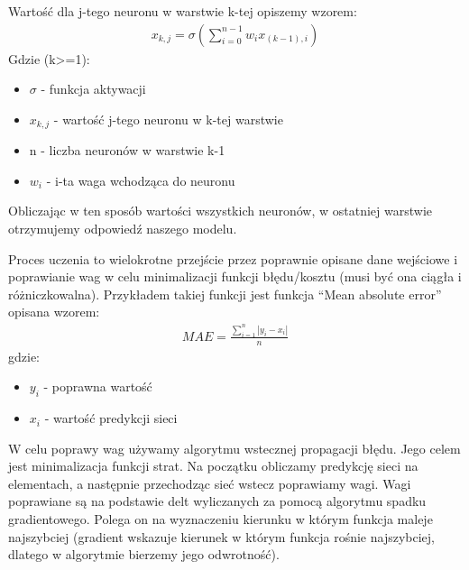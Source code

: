 \documentclass{article}
\begin{document}
Wartość dla j-tego neuronu w warstwie k-tej opiszemy wzorem:
\begin{align*}
    x_{k,j} = \sigma(\sum\limits_{i=0}^{n-1}{w_ix_{(k-1),i}})
\end{align*}
Gdzie (k>=1):
\begin{itemize}
    \item $\sigma$ - funkcja aktywacji
    \item $x_{k,j}$ - wartość j-tego neuronu w k-tej warstwie
    \item n - liczba neuronów w warstwie k-1
    \item $w_i$ - i-ta waga wchodząca do neuronu
\end{itemize}
Obliczając w ten sposób wartości wszystkich neuronów, w ostatniej warstwie otrzymujemy odpowiedź naszego modelu.

Proces uczenia to wielokrotne przejście przez poprawnie opisane dane wejściowe i poprawianie wag w celu minimalizacji funkcji błędu/kosztu (musi być ona ciągła i różniczkowalna).
Przykładem takiej funkcji jest funkcja ``Mean absolute error''\cite{mae-tf} opisana wzorem\cite{mae}:
\begin{align*}
    MAE=\frac{\sum\limits_{i=1}^{n}|{y_i - x_i}|}{n}
\end{align*}
gdzie:
\begin{itemize}
    \item $y_i$ - poprawna wartość
    \item $x_i$ - wartość predykcji sieci
\end{itemize}
W celu poprawy wag używamy algorytmu wstecznej propagacji błędu. Jego celem jest minimalizacja funkcji strat.
Na początku obliczamy predykcję sieci na elementach, a następnie przechodząc sieć wstecz poprawiamy wagi.
Wagi poprawiane są na podstawie delt wyliczanych za pomocą algorytmu spadku gradientowego.
Polega on na wyznaczeniu kierunku w którym funkcja maleje najszybciej (gradient wskazuje kierunek w którym funkcja rośnie najszybciej, dlatego w algorytmie bierzemy jego odwrotność).
\end{document}
